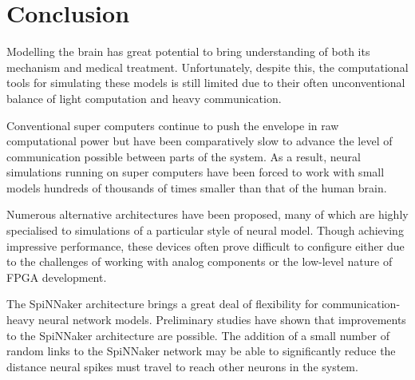 \chapter{Conclusion}
	
	
	Modelling the brain has great potential to bring understanding of both its
	mechanism and medical treatment. Unfortunately, despite this, the
	computational tools for simulating these models is still limited due to their
	often unconventional balance of light computation and heavy communication.
	
	
	Conventional super computers continue to push the envelope in raw
	computational power but have been comparatively slow to advance the level of
	communication possible between parts of the system. As a result, neural
	simulations running on super computers have been forced to work with small
	models hundreds of thousands of times smaller than that of the human brain.
	
	Numerous alternative architectures have been proposed, many of which are
	highly specialised to simulations of a particular style of neural model.
	Though achieving impressive performance, these devices often prove difficult
	to configure either due to the challenges of working with analog components or
	the low-level nature of FPGA development.
	
	
	The SpiNNaker architecture brings a great deal of flexibility for
	communication-heavy neural network models. Preliminary studies have shown that
	improvements to the SpiNNaker architecture are possible. The addition of a
	small number of random links to the SpiNNaker network may be able to
	significantly reduce the distance neural spikes must travel to reach other
	neurons in the system.
	
	
